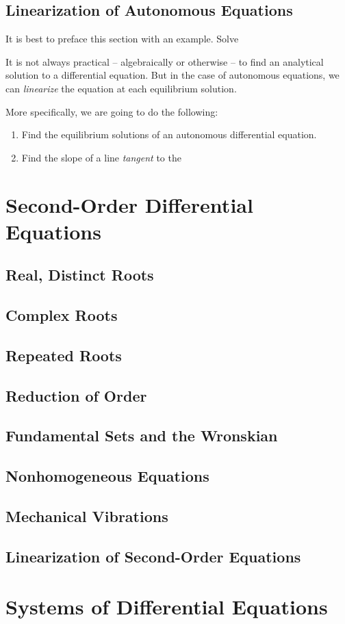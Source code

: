 \pagebreak

\subsection{Linearization of Autonomous Equations}
It is best to preface this section with an example. Solve

It is not always practical – algebraically or otherwise – to find an analytical solution to a differential equation. But in the case of autonomous equations, we can \textit{linearize} the equation at each equilibrium solution.

More specifically, we are going to do the following:
\begin{enumerate}
	\item Find the equilibrium solutions of an autonomous differential equation.
	\item Find the slope of a line \textit{tangent} to the
\end{enumerate}

\section{Second-Order Differential Equations}
\subsection{Real, Distinct Roots}

\subsection{Complex Roots}

\subsection{Repeated Roots}

\subsection{Reduction of Order}

\subsection{Fundamental Sets and the Wronskian}

\subsection{Nonhomogeneous Equations}

\subsection{Mechanical Vibrations}

\subsection{Linearization of Second-Order Equations}

\section{Systems of Differential Equations}

